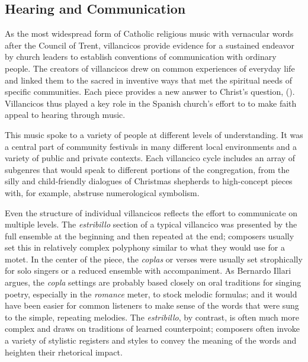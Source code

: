 \subsection{Hearing and Communication}

As the most widespread form of Catholic religious music with vernacular words
after the Council of Trent, villancicos provide evidence for a sustained
endeavor by church leaders to establish conventions of communication with
ordinary people.
The creators of villancicos drew on common experiences of everyday life and
linked them to the sacred in inventive ways that met the spiritual needs of
specific communities.
Each piece provides a new answer to Christ's question, 
().
Villancicos thus played a key role in the Spanish church's effort to to make
faith appeal to hearing through music.

This music spoke to a variety of people at different levels of understanding.
It was a central part of community festivals in many different local
environments and a variety of public and private contexts. 
Each villancico cycle includes an array of subgenres that would speak to
different portions of the congregation, from the silly and child-friendly
dialogues of Christmas shepherds to high-concept pieces with, for
example, abstruse numerological symbolism.

Even the structure of individual villancicos reflects the effort to communicate
on multiple levels.
The \emph{estribillo} section of a typical villancico was presented by the full
ensemble at the beginning and then repeated at the end; composers usually set
this in relatively complex polyphony similar to what they would use for a
motet.
In the center of the piece, the \emph{coplas} or verses were usually set
strophically for solo singers or a reduced ensemble with accompaniment.
As Bernardo Illari argues, the \emph{copla} settings are probably based closely
on oral traditions for singing poetry, especially in the \emph{romance} meter,
to stock melodic formulas; and it would have been easier for common listeners to
make sense of the words that were sung to the simple, repeating melodies.%
    \Autocite{Illari:Polychoral}
The \emph{estribillo}, by contrast, is often much more complex and draws on
traditions of learned counterpoint; composers often invoke a variety of
stylistic registers and styles to convey the meaning of the words and heighten
their rhetorical impact.

